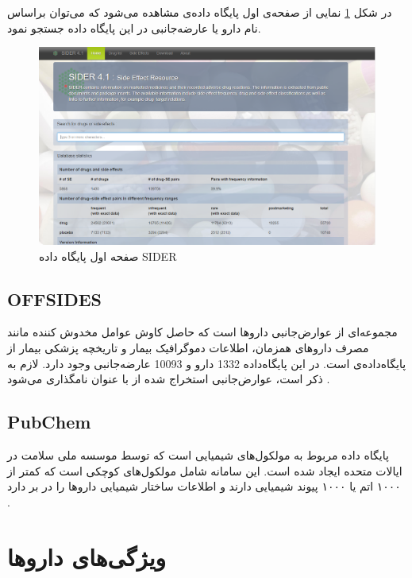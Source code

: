 در شکل 
\ref{fs5} 
نمایی از صفحه‌ی اول پایگاه داده‌ی
مشاهده می‌شود که می‌توان براساس نام دارو یا عارضه‌جانبی در این پایگاه ‌داده جستجو نمود. 
\begin{figure}[h!]
	\centering
	\includegraphics[scale=0.48]{section1/Sider1.png}
	\caption{ 
صفحه اول پایگاه داده SIDER}
	\label{fs5}
\end{figure}


\subsection{OFFSIDES}

مجموعه‌ای از عوارض‌جانبی داروها است که حاصل کاوش عوامل مخدوش کننده مانند مصرف داروهای همزمان، اطلاعات دموگرافیک بیمار و تاریخچه پزشکی بیمار از پایگاه‌داده‌ی 
است. در این پایگاه‌داده 1332 دارو و 10093 عارضه‌جانبی وجود دارد. لازم به ذکر است، عوارض‌جانبی استخراج شده از 
 با عنوان 
نامگذاری ‌می‌شود
\cite{Tatonetti2012}.

\subsection{PubChem}

پایگاه داده مربوط به مولکول‌های شیمیایی است که توسط موسسه ملی سلامت در ایالات متحده
ایجاد شده است. این سامانه شامل مولکول‌های کوچکی است که کمتر از ۱۰۰۰ اتم یا ۱۰۰۰ پیوند شیمیایی دارند و اطلاعات ساختار شیمیایی
داروها را در بر دارد
\cite{Y. Wang2009}.

\section{ویژگی‌های داروها} 


